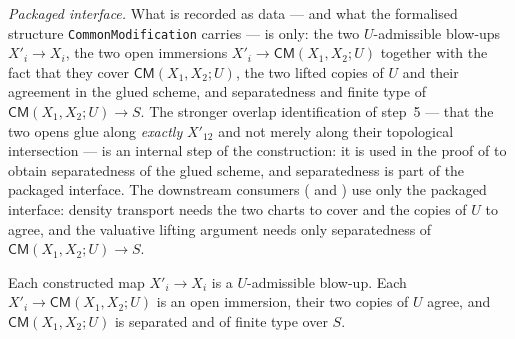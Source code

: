 \begin{definition}
  \emph{Packaged interface.}  What is recorded as data — and what the
  formalised structure \texttt{CommonModification} carries — is only: the two
  $U$-admissible blow-ups $X'_i\to X_i$, the two open immersions
  $X'_i\to\mathsf{CM}(X_1,X_2;U)$ together with the fact that they cover
  $\mathsf{CM}(X_1,X_2;U)$, the two lifted copies of $U$ and their agreement in
  the glued scheme, and separatedness and finite type of
  $\mathsf{CM}(X_1,X_2;U)\to S$.  The stronger overlap identification of step~5
  — that the two opens glue along \emph{exactly} $X'_{12}$ and not merely along
  their topological intersection — is an internal step of the construction: it is
  used in the proof of  to obtain
  separatedness of the glued scheme, and separatedness is part of the packaged
  interface.  The downstream consumers
  ( and
  ) use only the packaged
  interface: density transport needs the two charts to cover and the copies of
  $U$ to agree, and the valuative lifting argument needs only separatedness of
  $\mathsf{CM}(X_1,X_2;U)\to S$.
\end{definition}

\begin{lemma}
  \label{lemma:nagata-common-modification}
  \leanok

  Each constructed map $X'_i\to X_i$ is a $U$-admissible blow-up.  Each
  $X'_i\to\mathsf{CM}(X_1,X_2;U)$ is an open immersion, their two copies of
  $U$ agree, and $\mathsf{CM}(X_1,X_2;U)$ is separated and of finite type
  over $S$.
\end{lemma}

